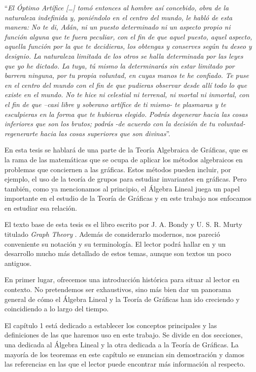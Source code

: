 \vspace{0.5cm}
``\textit{El Óptimo Artífice […] tomó entonces al hombre así concebido, obra de la naturaleza indefinida y, poniéndolo en el centro del mundo, le habló de esta manera: No te di, Adán, ni un puesto determinado ni un aspecto propio ni función alguna que te fuera peculiar, con el fin de que aquel puesto, aquel aspecto, aquella función por la que te decidieras, los obtengas y conserves según tu deseo y designio. La naturaleza limitada de los otros se halla determinada por las leyes que yo he dictado. La tuya, tú mismo la determinarás sin estar limitado por barrera ninguna, por tu propia voluntad, en cuyas manos te he confiado. Te puse en el centro del mundo con el fin de que pudieras observar desde allí todo lo que existe en el mundo. No te hice ni celestial ni terrenal, ni mortal ni inmortal, con el fin de que –casi libre y soberano artífice de ti mismo- te plasmaras y te esculpieras en la forma que te hubieras elegido. Podrás degenerar hacia las cosas inferiores que son los brutos; podrás -de acuerdo con la decisión de tu voluntad- regenerarte hacia las cosas superiores que son divinas}”.

\vspace{1 cm}
En esta tesis se hablará de una parte de la Teoría Algebraica de Gráficas, que es la rama de las matemáticas que se ocupa de aplicar los métodos algebraicos en problemas que conciernen a las gráficas. Estos métodos pueden incluir, por ejemplo, el uso de la teoría de grupos para estudiar invariantes en gráficas. Pero también, como ya mencionamos al principio, el Álgebra Lineal juega un papel importante en el estudio de la Teoría de Gráficas y en este trabajo nos enfocamos en estudiar esa relación.


El texto base de esta tesis es el libro escrito por J. A. Bondy y U. S. R. Murty titulado \textit{Graph Theory} \cite{Bondy}. Además de considerarlo modernos, nos  pareció conveniente  su notación y su terminología. El lector podrá hallar en \cite{Deo} y \cite{Seshu} un desarrollo mucho más detallado de estos temas, aunque son textos un poco antiguos. 


En primer lugar, ofrecemos una introducción histórica para situar al lector en contexto. No pretendemos ser exhaustivos, sino más bien dar un panorama general de cómo el Álgebra Lineal y la Teoría de Gráficas han ido creciendo y coincidiendo a lo largo del tiempo.


El capítulo 1 está dedicado a establecer los conceptos principales y las definiciones de las que haremos uso en este trabajo.  Se divide en dos secciones, una dedicada al Álgebra Lineal y la otra dedicada a la Teoría de Gráficas. La mayoría de los teoremas en este capítulo se enuncian sin demostración y damos las referencias en las que el lector puede encontrar más información al respecto.



